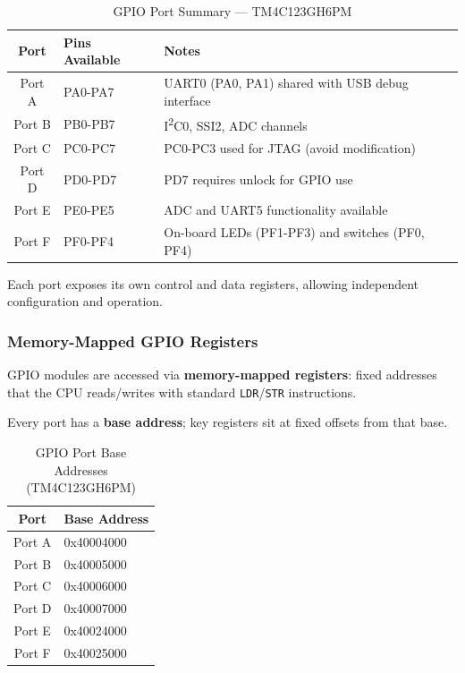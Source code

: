 \begin{table}[H]
\centering
\small
\renewcommand{\arraystretch}{1.2}
\begin{tabular}{cll}
\toprule
\textbf{Port} & \textbf{Pins Available} & \textbf{Notes} \\
\midrule
Port A & PA0-PA7 & UART0 (PA0, PA1) shared with USB debug interface \\
Port B & PB0-PB7 & I\textsuperscript{2}C0, SSI2, ADC channels \\
Port C & PC0-PC7 & PC0-PC3 used for JTAG (avoid modification) \\
Port D & PD0-PD7 & PD7 requires unlock for GPIO use \\
Port E & PE0-PE5 & ADC and UART5 functionality available \\
Port F & PF0-PF4 & On-board LEDs (PF1-PF3) and switches (PF0, PF4) \\
\bottomrule
\end{tabular}
\caption{GPIO Port Summary — TM4C123GH6PM}
\end{table}

\noindent
Each port exposes its own control and data registers, allowing independent configuration and operation.
\bigskip

\subsubsection{Memory-Mapped GPIO Registers}

GPIO modules are accessed via \textbf{memory-mapped registers}: fixed addresses that the CPU reads/writes with standard \texttt{LDR}/\texttt{STR} instructions.

\noindent
Every port has a \textbf{base address}; key registers sit at fixed offsets from that base.

\begin{table}[H]
\centering
\small
\begin{tabular}{cl}
\toprule
\textbf{Port} & \textbf{Base Address} \\
\midrule
Port A & 0x40004000 \\
Port B & 0x40005000 \\
Port C & 0x40006000 \\
Port D & 0x40007000 \\
Port E & 0x40024000 \\
Port F & 0x40025000 \\
\bottomrule
\end{tabular}
\caption{GPIO Port Base Addresses (TM4C123GH6PM)}
\end{table}

